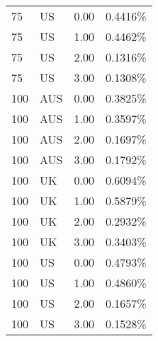\begin{table}[ht]
\begin{tabular}{llrl}
  75 & US & 0.00 & 0.4416\% \\ 
  75 & US & 1.00 & 0.4462\% \\ 
  75 & US & 2.00 & 0.1316\% \\ 
  75 & US & 3.00 & 0.1308\% \\ 
  100 & AUS & 0.00 & 0.3825\% \\ 
  100 & AUS & 1.00 & 0.3597\% \\ 
  100 & AUS & 2.00 & 0.1697\% \\ 
  100 & AUS & 3.00 & 0.1792\% \\ 
  100 & UK & 0.00 & 0.6094\% \\ 
  100 & UK & 1.00 & 0.5879\% \\ 
  100 & UK & 2.00 & 0.2932\% \\ 
  100 & UK & 3.00 & 0.3403\% \\ 
  100 & US & 0.00 & 0.4793\% \\ 
  100 & US & 1.00 & 0.4860\% \\ 
  100 & US & 2.00 & 0.1657\% \\ 
  100 & US & 3.00 & 0.1528\% \\ 
   \hline
\end{tabular}
\end{table}
